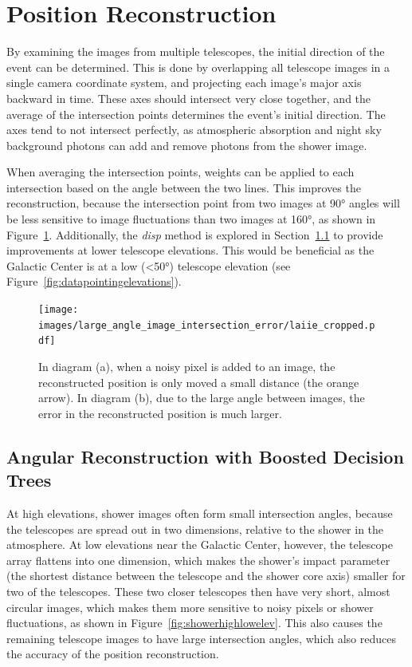 \section{Position Reconstruction}\label{subsec:posrecon}
By examining the images from multiple telescopes, the initial direction of the event can be determined.
This is done by overlapping all telescope images in a single camera coordinate system, and projecting each image's major axis backward in time.
These axes should intersect very close together, and the average of the intersection points determines the event's initial direction.
The axes tend to not intersect perfectly, as atmospheric absorption and night sky background photons can add and remove photons from the shower image.

When averaging the intersection points, weights can be applied to each intersection based on the angle between the two lines.
This improves the reconstruction, because the intersection point from two images at \ang{90} angles will be less sensitive to image fluctuations than two images at \ang{160}, as shown in Figure~\ref{fig:largeintersectangle}.
Additionally, the \textit{disp} method is explored in Section~\ref{subsec:disp} to provide improvements at lower telescope elevations.
This would be beneficial as the Galactic Center is at a low (<\ang{50}) telescope elevation (see Figure~\ref{fig:datapointingelevations}).

\begin{figure}[!t]
  \centering
  \texttt{[image: images/large\_angle\_image\_intersection\_error/laiie\_cropped.pdf]}
  \caption[Large Image Intersection Angles]{
    In diagram (a), when a noisy pixel is added to an image, the reconstructed position is only moved a small distance (the orange arrow).
    In diagram (b), due to the large angle between images, the error in the reconstructed position is much larger.
  }
  \label{fig:largeintersectangle}
\end{figure}
\FloatBarrier

\subsection{Angular Reconstruction with Boosted Decision Trees}\label{subsec:disp}
At high elevations, shower images often form small intersection angles, because the telescopes are spread out in two dimensions, relative to the shower in the atmosphere.
At low elevations near the Galactic Center, however, the telescope array flattens into one dimension, which makes the shower's impact parameter (the shortest distance between the telescope and the shower core axis) smaller for two of the telescopes.
These two closer telescopes then have very short, almost circular images, which makes them more sensitive to noisy pixels or shower fluctuations, as shown in Figure~\ref{fig:showerhighlowelev}.
This also causes the remaining telescope images to have large intersection angles, which also reduces the accuracy of the position reconstruction.

